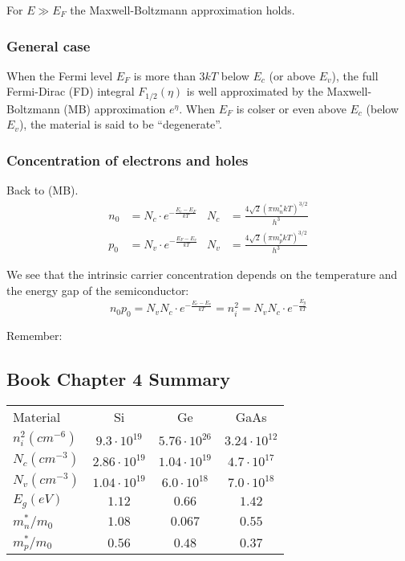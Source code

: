 \documentclass[a4paper, fontsize=8pt, landscape, DIV=1]{scrartcl}
\begin{document}
\begin{multicols*}{4}
  For $E \gg E_F$ the Maxwell-Boltzmann approximation holds.

  \subsubsection{General case}
  \ifdefined\makeultracompact\else
    When the Fermi level $E_F$ is more than $3kT$ below $E_c$ (or above $E_v$), the full Fermi-Dirac (FD) integral $F_{1/2}(\eta)$ is well approximated by the Maxwell-Boltzmann (MB) approximation $e^\eta$.
    When $E_F$ is colser or even above $E_c$ (below $E_v$), the material is said to be ``degenerate''.
  \fi

  \subsubsection{Concentration of electrons and holes}
  Back to (MB).
  \begin{align*}
    n_0 &= N_c \cdot e^{-\frac{E_c-E_F}{kT}} & N_c &= \frac{4\sqrt{2}(\pi m^*_n kT)^{3/2}}{h^3} \\
    p_0 &= N_v \cdot e^{-\frac{E_F-E_v}{kT}} & N_v &= \frac{4\sqrt{2}(\pi m^*_p kT)^{3/2}}{h^3} 
  \end{align*}

  We see that the intrinsic carrier concentration depends on the temperature and the energy gap of the semiconductor:
  \[n_0 p_0 = N_v N_c \cdot e^{-\frac{E_c-E_v}{kT}} = n_i^2 = N_vN_c\cdot e^{-\frac{E_g}{kT}}\]

  Remember: 
  
  \subsection{Book Chapter 4 Summary}

      \begin{tabular}[h]{l c c c}
        Material & Si & Ge & GaAs \\
        $n_i^2(cm^{-6})$  & $9.3\cdot 10^{19}$  & $5.76\cdot 10^{26}$ & $3.24\cdot 10^{12}$ \\
        $N_c(cm^{-3})$    & $2.86\cdot 10^{19}$ & $1.04\cdot 10^{19}$ & $4.7\cdot 10^{17}$ \\

        $N_v(cm^{-3})$    & $1.04\cdot 10^{19}$ & $6.0\cdot 10^{18}$  & $7.0\cdot 10^{18}$ \\
        $E_g (eV)$        & $1.12$ & $0.66$ & $1.42$ \\
        $m_n^*/m_0$       & $1.08$ & $0.067$ & $0.55$\\
        $m_p^*/m_0$       & $0.56$ & $0.48$ & $0.37$\\
      \end{tabular}


\end{multicols*}
\end{document}
